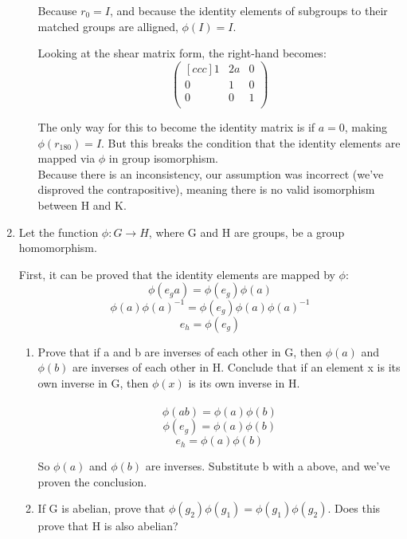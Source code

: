 \begin{enumerate}
\begin{enumerate}
      Because $r_0 = I$, and because the identity elements of subgroups to their matched groups are alligned, $\phi(I) = I$.

      Looking at the shear matrix form, the right-hand becomes:
      $$
      \begin{pmatrix}[ccc]
        1 & 2a & 0 \\
        0 &  1 & 0 \\
        0 &  0 & 1 \\
      \end{pmatrix}
      $$

      The only way for this to become the identity matrix is if $a = 0$, making $\phi(r_{180}) = I$. But this breaks the condition that the identity elements are mapped via $\phi$ in group isomorphism.\\

      Because there is an inconsistency, our assumption was incorrect (we've disproved the contrapositive), meaning there is no valid isomorphism between H and K.      
    \end{enumerate}

  \item Let the function $\phi: G \rightarrow H$, where G and H are groups, be a group homomorphism.

    First, it can be proved that the identity elements are mapped by $\phi$:
    $$\phi(e_ga) = \phi(e_g)\phi(a)$$
    $$\phi(a)\phi(a)^{-1} = \phi(e_g)\phi(a)\phi(a)^{-1}$$
    $$e_h = \phi(e_g)$$
    
    \begin{enumerate}
    \item
      Prove that if a and b are inverses of each other in G, then $\phi(a)$ and $\phi(b)$ are inverses of each other in H. Conclude that if an element x is its own inverse in G, then $\phi(x)$ is its own inverse in H.\\\\

      $$\phi(ab) = \phi(a)\phi(b)$$
      $$\phi(e_g) = \phi(a)\phi(b)$$
      $$e_h = \phi(a)\phi(b)$$

      So $\phi(a)$ and $\phi(b)$ are inverses. Substitute b with a above, and we've proven the conclusion.

    \item
      If G is abelian, prove that $\phi(g_2)\phi(g_1) = \phi(g_1)\phi(g_2)$. Does this prove that H is also abelian?\\\\


\end{enumerate}
\end{enumerate}

